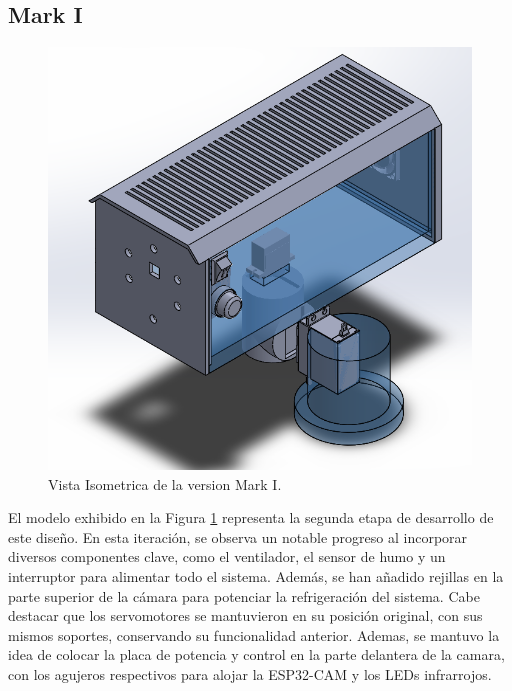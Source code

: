 \subsection{Mark I}
    \begin{figure}[H]
    \centering
    \begin{adjustbox}{width=\linewidth/2}
      \includegraphics{media/Mark__01.png}
    \end{adjustbox}
    \caption{\label{fig:isometrico_Mark01}Vista Isometrica de la version Mark I.}
    \end{figure}
     El modelo exhibido en la Figura \ref{fig:isometrico_Mark01} representa la segunda etapa de desarrollo de este diseño. En esta iteración, se observa un notable progreso al incorporar diversos componentes clave, como el ventilador, el sensor de humo y un interruptor para alimentar todo el sistema. Además, se han añadido rejillas en la parte superior de la cámara para potenciar la refrigeración del sistema. Cabe destacar que los servomotores se mantuvieron en su posición original, con sus mismos soportes, conservando su funcionalidad anterior.
     Ademas, se mantuvo la idea de colocar la placa de potencia y control en la parte delantera de la camara, con los agujeros respectivos para alojar la ESP32-CAM y los LEDs infrarrojos.

\needspace{3cm}
